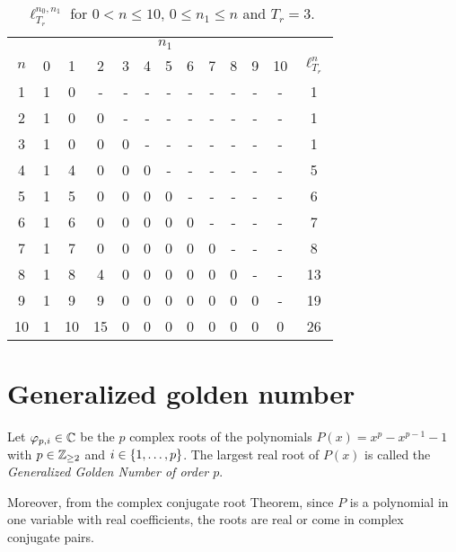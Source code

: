 \documentclass{article}
\begin{document}
  \begin{table}[!ht]
    \centering
    \begin{tabular}{*{13}{c}}
      \toprule
      & \multicolumn{11}{c}{$n_1$} & \\
      $n$ & 0 & 1 & 2 & 3 & 4 & 5 & 6 & 7 & 8 & 9 & 10 & $\ell_{T_r}^{n}$ \\
      \midrule
      1 & 1 & 0 & - & - & - & - & - & - & - & - & - & 1 \\
      2 & 1 & 0 & 0 & - & - & - & - & - & - & - & - & 1 \\
      3 & 1 & 0 & 0 & 0 & - & - & - & - & - & - & - & 1 \\
      4 & 1 & 4 & 0 & 0 & 0 & - & - & - & - & - & - & 5 \\
      5 & 1 & 5 & 0 & 0 & 0 & 0 & - & - & - & - & - & 6 \\
      6 & 1 & 6 & 0 & 0 & 0 & 0 & 0 & - & - & - & - & 7 \\
      7 & 1 & 7 & 0 & 0 & 0 & 0 & 0 & 0 & - & - & - & 8 \\
      8 & 1 & 8 & 4 & 0 & 0 & 0 & 0 & 0 & 0 & - & - & 13 \\
      9 & 1 & 9 & 9 & 0 & 0 & 0 & 0 & 0 & 0 & 0 & - & 19 \\
      10 & 1 & 10 & 15 & 0 & 0 & 0 & 0 & 0 & 0 & 0 & 0 & 26 \\
      \bottomrule
    \end{tabular}
    \caption{$\ell_{T_r}^{n_0,n_1}$ for $0 < n \leq 10$, $0 \leq n_1 \leq n$ and $T_r = 3$.}
  \end{table}

    \newpage
    \appendix
    \section{Generalized golden number}

    \begin{definition} \label{def:golden_number}
      Let $\varphi_{p, i} \in \mathbb C$ be the $p$ complex roots of the polynomials $P(x) = x^p - x^{p-1} - 1$
      with $p \in \mathbb{Z}_{\geq 2}$ and $i \in \{1, \dots, p\}$. The largest real root of $P(x)$ is called the \emph{Generalized Golden Number 
      of order $p$}.
    \end{definition}

    \begin{remark}
      Moreover, from the complex conjugate root Theorem, since $P$ is a polynomial in one variable with real coefficients, the roots are
      real or come in complex conjugate pairs.
    \end{remark}
\end{document}

